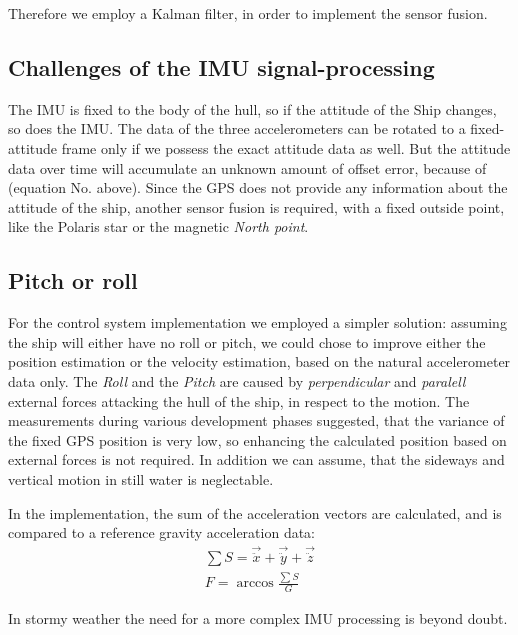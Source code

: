 Therefore we employ a Kalman filter, in order to implement the sensor fusion.

\subsection{Challenges of the IMU signal-processing}

The IMU is fixed to the body of the hull, so if the attitude of the Ship changes, so does the \ac{IMU}. The data of the three accelerometers can be rotated to a fixed-attitude frame only if we possess the exact attitude data as well. But the attitude data over time will accumulate an unknown amount of offset error, because of (equation No. above).
Since the GPS does not provide any information about the attitude of the ship, another sensor fusion is required, with a fixed outside point, like the Polaris star or the magnetic \emph{North point}.

\subsection{Pitch or roll}

For the control system implementation we employed a simpler solution: assuming the ship will either have no roll or pitch, we could chose to improve either the position estimation or the velocity estimation, based on the natural accelerometer data only.
The \emph{Roll} and the \emph{Pitch} are caused by \emph{perpendicular} and \emph{paralell} external forces attacking the hull of the ship, in respect to the motion.
The measurements during various development phases suggested, that the variance of the fixed GPS position is very low, so enhancing the calculated position based on external forces is not required. In addition we can assume, that the sideways and vertical motion in still water is neglectable.

In the implementation, the sum of the acceleration vectors are calculated, and is compared to a reference gravity acceleration data:
\begin{align}
\sum S = \vec{\ddot{x}} + \vec{\ddot{y}} + \vec{\ddot{z}} \\
F = \arccos{\frac{\sum S}{G}}
\end{align}

In stormy weather the need for a more complex \ac{IMU} 	processing is beyond doubt.
